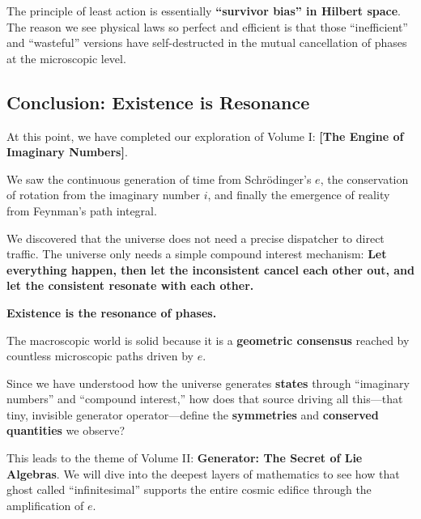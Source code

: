 The principle of least action is essentially \textbf{``survivor bias'' in Hilbert space}. The reason we see physical laws so perfect and efficient is that those ``inefficient'' and ``wasteful'' versions have self-destructed in the mutual cancellation of phases at the microscopic level.

\subsection{Conclusion: Existence is Resonance}

At this point, we have completed our exploration of Volume I: \textbf{[The Engine of Imaginary Numbers]}.

We saw the continuous generation of time from Schrödinger's $e$, the conservation of rotation from the imaginary number $i$, and finally the emergence of reality from Feynman's path integral.

We discovered that the universe does not need a precise dispatcher to direct traffic. The universe only needs a simple compound interest mechanism: \textbf{Let everything happen, then let the inconsistent cancel each other out, and let the consistent resonate with each other.}

\textbf{Existence is the resonance of phases.}

The macroscopic world is solid because it is a \textbf{geometric consensus} reached by countless microscopic paths driven by $e$.

Since we have understood how the universe generates \textbf{states} through ``imaginary numbers'' and ``compound interest,'' how does that source driving all this---that tiny, invisible generator operator---define the \textbf{symmetries} and \textbf{conserved quantities} we observe?

This leads to the theme of Volume II: \textbf{Generator: The Secret of Lie Algebras}. We will dive into the deepest layers of mathematics to see how that ghost called ``infinitesimal'' supports the entire cosmic edifice through the amplification of $e$.

